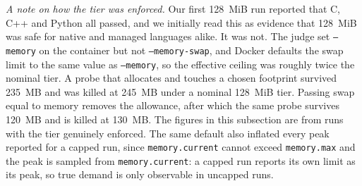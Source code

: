 \documentclass[conference]{IEEEtran}
\begin{document}
\emph{A note on how the tier was enforced.} Our first 128~MiB run reported that C, C++ and Python all passed, and we initially read this as evidence that 128~MiB was safe for native and managed languages alike. It was not. The judge set \texttt{--memory} on the container but not \texttt{--memory-swap}, and Docker defaults the swap limit to the same value as \texttt{--memory}, so the effective ceiling was roughly twice the nominal tier. A probe that allocates and touches a chosen footprint survived 235~MB and was killed at 245~MB under a nominal 128~MiB tier. Passing swap equal to memory removes the allowance, after which the same probe survives 120~MB and is killed at 130~MB. The figures in this subsection are from runs with the tier genuinely enforced. The same default also inflated every peak reported for a capped run, since \texttt{memory.current} cannot exceed \texttt{memory.max} and the peak is sampled from \texttt{memory.current}: a capped run reports its own limit as its peak, so true demand is only observable in uncapped runs.
\end{document}

